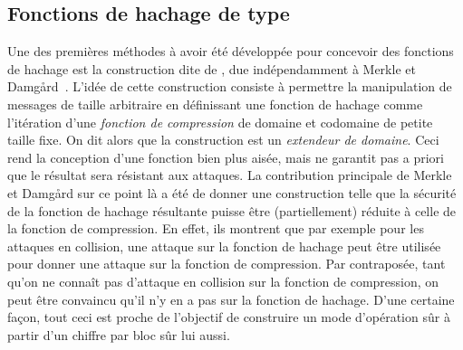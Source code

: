 \subsection{Fonctions de hachage de type \merkdam}
\label{sec:fmd}

Une des premières méthodes à avoir été développée pour concevoir des fonctions de hachage est la construction dite de \merkdam,
due indépendamment à Merkle et Damg\aa rd~\cite{DBLP:conf/crypto/Merkle89a,DBLP:conf/crypto/Damgard89a}.
L'idée de cette construction consiste à permettre la manipulation de messages de taille arbitraire en définissant
une fonction de hachage comme l'itération d'une \emph{fonction de compression} de domaine et codomaine de petite
taille fixe. On dit alors que la construction est un \emph{extendeur de domaine}.
Ceci rend la conception d'une fonction bien plus aisée, mais ne garantit pas a priori que le résultat sera résistant aux attaques.
La contribution principale de Merkle et Damg\aa rd sur ce point là a été de donner une construction telle que la sécurité de la fonction
de hachage résultante puisse être (partiellement) réduite à celle de la fonction de compression. En effet, ils montrent que par exemple
pour les attaques en collision, une attaque sur la fonction de hachage peut être utilisée pour donner une attaque sur la fonction
de compression. Par contraposée, tant qu'on ne connaît pas d'attaque en collision sur la fonction de compression, on peut être convaincu
qu'il n'y en a pas sur la fonction de hachage. D'une certaine façon, tout ceci est proche de l'objectif de construire un mode d'opération sûr
à partir d'un chiffre par bloc sûr lui aussi. 

